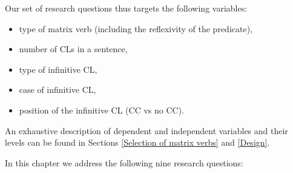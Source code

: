 Our set of research questions thus targets the following variables:

\begin{itemize}
\item type of matrix verb (including the reflexivity of the predicate),
\item number of CLs in a sentence,
\item type of infinitive CL,
\item case of infinitive CL,
\item position of the infinitive CL (CC vs no CC).
\end{itemize}

An exhaustive description of dependent and independent variables and their levels can be found in Sections \ref{Selection of matrix verbs} and \ref{Design}.

In this chapter we address the following nine research questions:

